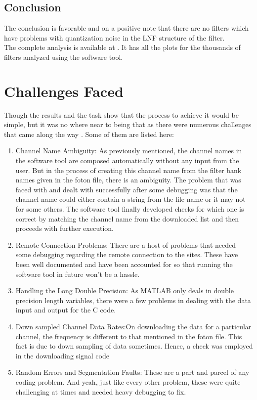 \documentclass[colorlinks=true,pdfstartview=FitV,linkcolor=blue,
            citecolor=red,urlcolor=magenta]{ligodoc}
\begin{document}
	\subsection{Conclusion} The conclusion is favorable and on a positive note that there are no filters which have problems with quantization noise in the LNF structure of the filter. \\
	The complete analysis is available at \cite{drive}. It has all the plots for the thousands of filters analyzed using the software tool.
\section{Challenges Faced} 
Though the results and the task show that the process to achieve it would be simple, but it was no where near to being that as there were numerous challenges that came along the way . Some of them are listed here:
	\begin{enumerate}
		\item Channel Name Ambiguity: As previously mentioned, the channel names in the software tool are composed automatically without any input from the user. But in the process of creating this channel name from the filter bank names given in the foton file, there is an ambiguity. The problem that was faced with and dealt with successfully after some debugging was that the channel name could either contain a string from the file name or it may not for some others. The software tool finally developed checks for which one is correct by matching the channel name from the downloaded list and then proceeds with further execution.
		\item Remote Connection Problems: There are a host of problems that needed some debugging regarding the remote connection to the sites. These have been well documented and have been accounted for so that running the software tool in future won't be a hassle.
		\item Handling the Long Double Precision: As MATLAB only deals in double precision length variables, there were a few problems in dealing with the data input and output for the C code.
		\item Down sampled Channel Data Rates:On downloading the data for a particular channel, the frequency is different to that mentioned in the foton file. This fact is due to down sampling of data sometimes. Hence, a check was employed in the downloading signal code 
		\item Random Errors and Segmentation Faults: These are a part and parcel of any coding problem. And yeah, just like every other problem, these were quite challenging at times and needed heavy debugging to fix. 
		\end{enumerate}
\end{document}
